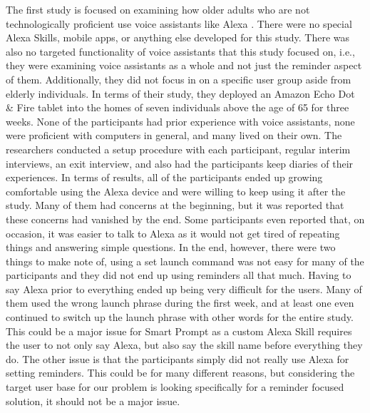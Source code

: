 \documentclass[11pt, oneside]{article}
\begin{document}
The first study is focused on examining how older adults who are not technologically proficient use voice assistants like Alexa \cite{b1}. 
There were no special Alexa Skills, mobile apps, or anything else developed for this study. 
There was also no targeted functionality of voice assistants that this study focused on, i.e., they were examining voice assistants as a whole and not just the reminder aspect of them. 
Additionally, they did not focus in on a specific user group aside from elderly individuals. 
In terms of their study, they deployed an Amazon Echo Dot \& Fire tablet into the homes of seven individuals above the age of 65 for three weeks. 
None of the participants had prior experience with voice assistants, none were proficient with computers in general, and many lived on their own. 
The researchers conducted a setup procedure with each participant, regular interim interviews, an exit interview, and also had the participants keep diaries of their experiences. 
In terms of results, all of the participants ended up growing comfortable using the Alexa device and were willing to keep using it after the study. 
Many of them had concerns at the beginning, but it was reported that these concerns had vanished by the end. 
Some participants even reported that, on occasion, it was easier to talk to Alexa as it would not get tired of repeating things and answering simple questions. 
In the end, however, there were two things to make note of, using a set launch command was not easy for many of the participants and they did not end up using reminders all that much. 
Having to say Alexa prior to everything ended up being very difficult for the users. 
Many of them used the wrong launch phrase during the first week, and at least one even continued to switch up the launch phrase with other words for the entire study. 
This could be a major issue for Smart Prompt as a custom Alexa Skill requires the user to not only say Alexa, but also say the skill name before everything they do. 
The other issue is that the participants simply did not really use Alexa for setting reminders. 
This could be for many different reasons, but considering the target user base for our problem is looking specifically for a reminder focused solution, it should not be a major issue. 
\end{document}

